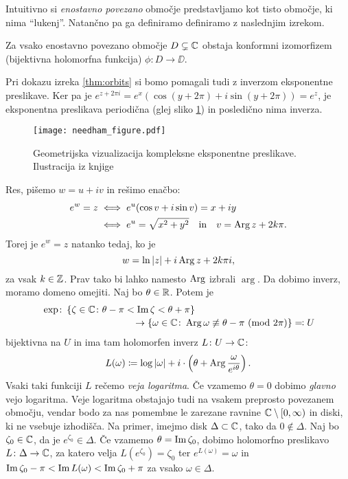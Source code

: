 \noindent Intuitivno si \emph{enostavno povezano} območje predstavljamo kot tisto območje, ki nima ``lukenj''. Natančno pa ga definiramo definiramo z naslednjim izrekom.

\begin{izrek}
    Za vsako enostavno povezano območje \(D \subsetneq \mathbb C\) obstaja konformni izomorfizem (bijektivna holomorfna funkcija) \(\phi \colon D \to \DD\).
\end{izrek}

\vspace{0.5cm}
\noindent Pri dokazu izreka \ref{thm:orbits} si bomo pomagali tudi z inverzom eksponentne preslikave. Ker pa je \(e^{z + 2 \pi i} = e^x (\cos (y + 2 \pi) + i \sin (y + 2 \pi)) = e^z\), je eksponentna preslikava periodična (glej sliko \ref{fig:exponential}) in posledično nima inverza.
\begin{figure}
    \centering
    \texttt{[image: needham\_figure.pdf]}
    \caption[Geometrijsko delovanje kompleksne eksponentne preslikave]{Geometrijska vizualizacija kompleksne eksponentne preslikave. Ilustracija iz knjige \cite{Needham_1997}}
    \label{fig:exponential}
\end{figure}
Res, pišemo \(w = u + i v\) in rešimo enačbo:
\begin{align*}
    e^w = z &\iff e^u (\cos v + i \sin v) = x + i y\\
            &\iff e^u = \sqrt{x^2 + y^2} \quad \text{in} \quad v = \operatorname{Arg} z + 2 k \pi.
\end{align*}
Torej je \(e^w = z\) natanko tedaj, ko je
\[w = \ln |z| + i \operatorname{Arg} z + 2 k \pi i,\]
za vsak \(k \in \mathbb Z\). Prav tako bi lahko namesto \(\operatorname{Arg}\) izbrali \(\arg\). Da dobimo inverz, moramo domeno omejiti. Naj bo \(\theta \in \mathbb R\). Potem je
\[\begin{multlined}[10cm]
    \exp \colon  \set{\zeta \in \CC \colon \theta -\pi < \im \zeta < \theta + \pi}\\
    \to \set{\omega \in \CC \colon \Arg \omega \not\equiv \theta - \pi\ (\operatorname{mod}\, 2 \pi)} \eqcolon U
\end{multlined}\]
bijektivna na \(U\) in ima tam holomorfen inverz \(L \colon U \to \mathbb C\):
\[L (\omega) \coloneq \log |\omega| + i \cdot \left( \theta + \operatorname{Arg} \frac{\omega}{e^{i \theta}} \right).\]
Vsaki taki funkciji \(L\) rečemo \emph{veja logaritma}. Če vzamemo \(\theta = 0\) dobimo \emph{glavno} vejo logaritma. Veje logaritma obstajajo tudi na vsakem preprosto povezanem območju, vendar bodo za nas pomembne le zarezane ravnine \(\mathbb C \setminus [0, \infty)\) in diski, ki ne vsebuje izhodišča. Na primer, imejmo disk \(\Delta \subset \mathbb C\), tako da \(0 \notin \Delta\). Naj bo \(\zeta_0 \in \mathbb C\), da je \(e^{\zeta_0} \in \Delta\). Če vzamemo \(\theta = \operatorname{Im} \zeta_0\), dobimo holomorfno preslikavo \(L \colon \Delta \to \mathbb C\), za katero velja \(L (e^{\zeta_0}) = \zeta_0\) ter \(e^{L (\omega)} = \omega\) in \(\operatorname{Im} \zeta_0 - \pi < \operatorname{Im} L (\omega) < \operatorname{Im} \zeta_0 + \pi\) za vsako \(\omega \in \Delta\).

